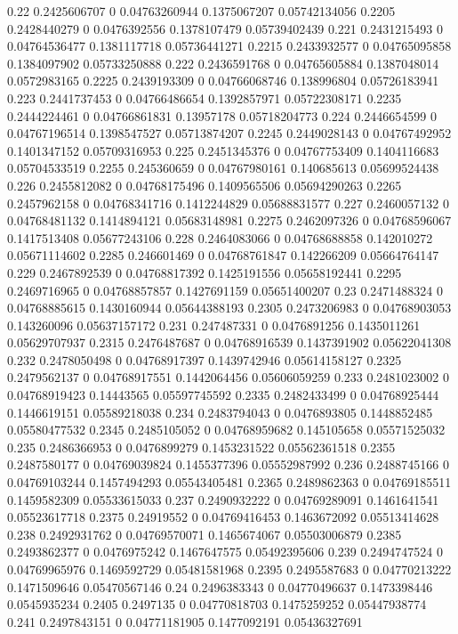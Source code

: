 {0.22 0.2425606707 0 0.04763260944 0.1375067207 0.05742134056
0.2205 0.2428440279 0 0.0476392556 0.1378107479 0.05739402439
0.221 0.2431215493 0 0.04764536477 0.1381117718 0.05736441271
0.2215 0.2433932577 0 0.04765095858 0.1384097902 0.05733250888
0.222 0.2436591768 0 0.04765605884 0.1387048014 0.0572983165
0.2225 0.2439193309 0 0.04766068746 0.138996804 0.05726183941
0.223 0.2441737453 0 0.04766486654 0.1392857971 0.05722308171
0.2235 0.2444224461 0 0.04766861831 0.13957178 0.05718204773
0.224 0.2446654599 0 0.04767196514 0.1398547527 0.05713874207
0.2245 0.2449028143 0 0.04767492952 0.1401347152 0.05709316953
0.225 0.2451345376 0 0.04767753409 0.1404116683 0.05704533519
0.2255 0.245360659 0 0.04767980161 0.140685613 0.05699524438
0.226 0.2455812082 0 0.04768175496 0.1409565506 0.05694290263
0.2265 0.2457962158 0 0.04768341716 0.1412244829 0.05688831577
0.227 0.2460057132 0 0.04768481132 0.1414894121 0.05683148981
0.2275 0.2462097326 0 0.04768596067 0.1417513408 0.05677243106
0.228 0.2464083066 0 0.04768688858 0.142010272 0.05671114602
0.2285 0.246601469 0 0.04768761847 0.142266209 0.05664764147
0.229 0.2467892539 0 0.04768817392 0.1425191556 0.05658192441
0.2295 0.2469716965 0 0.04768857857 0.1427691159 0.05651400207
0.23 0.2471488324 0 0.04768885615 0.1430160944 0.05644388193
0.2305 0.2473206983 0 0.04768903053 0.143260096 0.05637157172
0.231 0.247487331 0 0.0476891256 0.1435011261 0.05629707937
0.2315 0.2476487687 0 0.04768916539 0.1437391902 0.05622041308
0.232 0.2478050498 0 0.04768917397 0.1439742946 0.05614158127
0.2325 0.2479562137 0 0.04768917551 0.1442064456 0.05606059259
0.233 0.2481023002 0 0.04768919423 0.14443565 0.05597745592
0.2335 0.2482433499 0 0.04768925444 0.1446619151 0.05589218038
0.234 0.2483794043 0 0.0476893805 0.1448852485 0.05580477532
0.2345 0.2485105052 0 0.04768959682 0.145105658 0.05571525032
0.235 0.2486366953 0 0.0476899279 0.1453231522 0.05562361518
0.2355 0.2487580177 0 0.04769039824 0.1455377396 0.05552987992
0.236 0.2488745166 0 0.04769103244 0.1457494293 0.05543405481
0.2365 0.2489862363 0 0.04769185511 0.1459582309 0.05533615033
0.237 0.2490932222 0 0.04769289091 0.1461641541 0.05523617718
0.2375 0.24919552 0 0.04769416453 0.1463672092 0.05513414628
0.238 0.2492931762 0 0.04769570071 0.1465674067 0.05503006879
0.2385 0.2493862377 0 0.0476975242 0.1467647575 0.05492395606
0.239 0.2494747524 0 0.04769965976 0.1469592729 0.05481581968
0.2395 0.2495587683 0 0.04770213222 0.1471509646 0.05470567146
0.24 0.2496383343 0 0.04770496637 0.1473398446 0.0545935234
0.2405 0.2497135 0 0.04770818703 0.1475259252 0.05447938774
0.241 0.2497843151 0 0.04771181905 0.1477092191 0.05436327691
}
